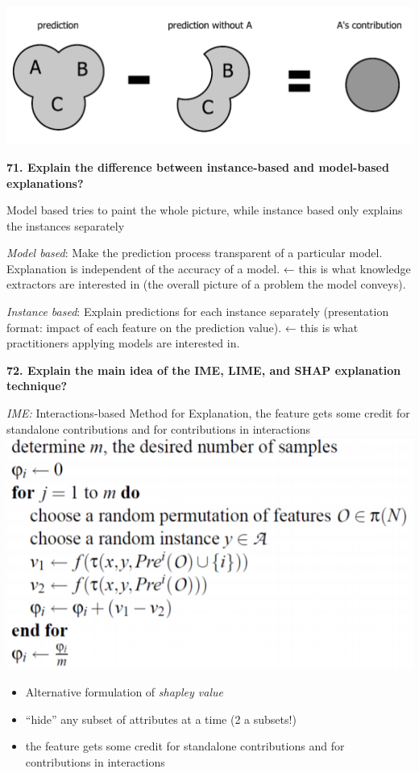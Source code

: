 \includegraphics[width=\columnwidth]{media/image6.png}

\textbf{71. Explain the difference between instance-based and
model-based explanations?}

Model based tries to paint the whole picture, while instance based only
explains the instances separately

\textit{Model based}: Make the prediction process transparent of a
particular model. Explanation is independent of the accuracy of a model.
← this is what knowledge extractors are interested in (the overall
picture of a problem the model conveys).

\textit{Instance based}: Explain predictions for each instance
separately (presentation format: impact of each feature on the
prediction value). ← this is what practitioners applying models are
interested in.

\textbf{72. Explain the main idea of the IME, LIME, and SHAP explanation
technique?}

\textit{IME:} Interactions-based Method for Explanation, the feature
gets some credit for standalone contributions and for contributions in
interactions
\includegraphics[width=\columnwidth]{media/image21.png}

\begin{itemize}
\item Alternative formulation of \textit{shapley value}
\item ``hide'' any subset of attributes at a time (2 a subsets!)
\item the feature gets some credit for standalone contributions and for contributions in interactions
\end{itemize}


